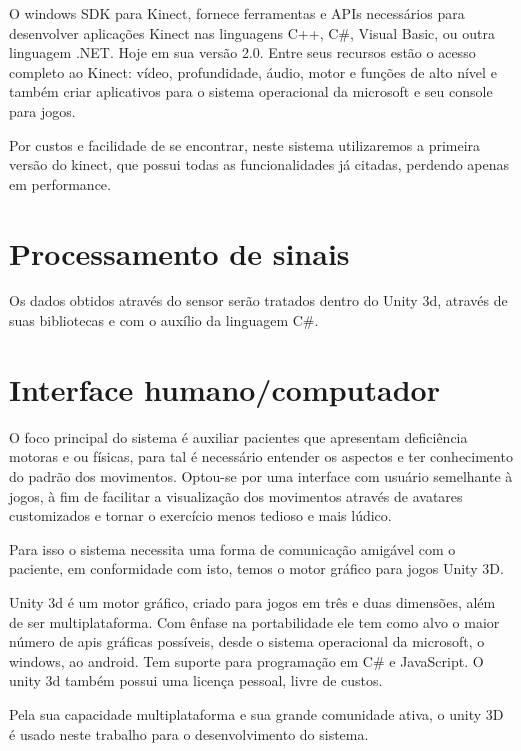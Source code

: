  O windows SDK para Kinect, fornece ferramentas e APIs necessários para desenvolver
aplicações Kinect nas linguagens  C++, C\#, Visual Basic, ou outra linguagem .NET. Hoje em sua versão 2.0. Entre seus recursos estão o acesso completo ao Kinect: vídeo,
profundidade, áudio, motor e funções de alto nível e também  criar aplicativos
para o sistema operacional da microsoft e seu console para jogos.

  Por custos e facilidade de se encontrar, neste sistema utilizaremos a primeira versão do kinect, que possui todas as funcionalidades já citadas, perdendo apenas
em performance.

\section{Processamento de sinais}
\label{sec:Processamento de sinais}
  Os dados obtidos através do sensor serão tratados dentro do Unity 3d, através de suas bibliotecas e com o auxílio da
 linguagem C\#.

\section{Interface humano/computador}
\label{sec:Interface humano/computador}
  O foco principal do sistema é auxiliar pacientes que apresentam deficiência
motoras e ou físicas, para tal é necessário entender os aspectos e
ter conhecimento do padrão dos movimentos.
Optou-se por uma interface com usuário semelhante à jogos, à fim de facilitar a visualização dos movimentos através de avatares customizados e tornar o exercício menos tedioso e mais lúdico.


Para isso o sistema necessita
uma forma de comunicação amigável com o paciente, em conformidade com isto,
temos o motor gráfico para jogos Unity 3D.

  Unity 3d é um motor gráfico, criado para jogos em três e duas dimensões, além de ser
multiplataforma. Com ênfase na portabilidade ele tem como alvo o maior número
de apis gráficas possíveis, desde o sistema operacional da microsoft, o windows,
ao android.  Tem suporte para programação em C\# e JavaScript. O unity 3d também
 possui uma licença pessoal, livre de custos.

  Pela sua capacidade multiplataforma e sua grande comunidade ativa, o unity 3D
é usado neste trabalho para o desenvolvimento do sistema.

%



